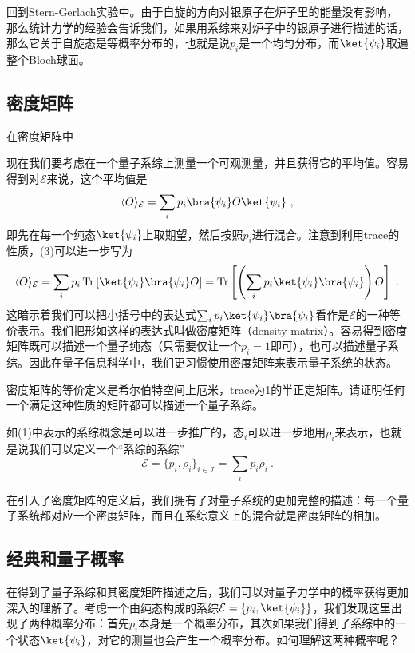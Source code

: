 回到Stern-Gerlach实验中。由于自旋的方向对银原子在炉子里的能量没有影响，那么统计力学的经验会告诉我们，如果用系综来对炉子中的银原子进行描述的话，那么它关于自旋态是等概率分布的，也就是说$p_i$是一个均匀分布，而$\ket{\psi_i}$取遍整个Bloch球面。

\subsection{密度矩阵}

在密度矩阵中

现在我们要考虑在一个量子系综上测量一个可观测量，并且获得它的平均值。容易得到对$\mathcal{E}$来说，这个平均值是\begin{equation}
\langle O\rangle_\mathcal{E}=\sum_i p_i\bra{\psi_i}O\ket{\psi_i}~,
\end{equation}
即先在每一个纯态$\ket{\psi_i}$上取期望，然后按照$p_i$进行混合。注意到利用trace的性质，(3)可以进一步写为
\begin{equation}
\langle O\rangle_\mathcal{E}=\sum_i p_i\operatorname{Tr}\left[\ket{\psi_i}\bra{\psi_i}O\right]=\operatorname{Tr}\left[\left(\sum_i p_i\ket{\psi_i}\bra{\psi_i}\right)O\right]~.
\end{equation}
这暗示着我们可以把小括号中的表达式$\sum_i p_i\ket{\psi_i}\bra{\psi_i}$看作是$\mathcal{E}$的一种等价表示。我们把形如这样的表达式叫做密度矩阵（density matrix）。容易得到密度矩阵既可以描述一个量子纯态（只需要仅让一个$p_i=1$即可），也可以描述量子系综。因此在量子信息科学中，我们更习惯使用密度矩阵来表示量子系统的状态。
\begin{exercise}{}
密度矩阵的等价定义是希尔伯特空间上厄米，trace为1的半正定矩阵。请证明任何一个满足这种性质的矩阵都可以描述一个量子系综。
\end{exercise}

如(1)中表示的系综概念是可以进一步推广的，$\text{态}_i$可以进一步地用$\rho_i$来表示，也就是说我们可以定义一个“系综的系综”
\begin{equation}\mathcal{E}=\{p_i,\rho_i\}_{i\in\mathcal{I}}=\sum_i p_i\rho_i~.\end{equation}

在引入了密度矩阵的定义后，我们拥有了对量子系统的更加完整的描述：每一个量子系统都对应一个密度矩阵，而且在系综意义上的混合就是密度矩阵的相加。

\subsection{经典和量子概率}

在得到了量子系综和其密度矩阵描述之后，我们可以对量子力学中的概率获得更加深入的理解了。考虑一个由纯态构成的系综$\mathcal{E}=\{p_i,\ket{\psi_i}\}$，我们发现这里出现了两种概率分布：首先$p_i$本身是一个概率分布，其次如果我们得到了系综中的一个状态$\ket{\psi_i}$，对它的测量也会产生一个概率分布。如何理解这两种概率呢？

